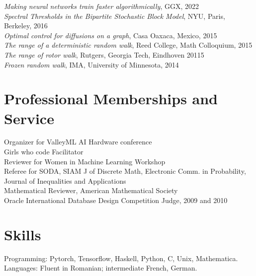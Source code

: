 \documentclass[margin,line]{res}
\begin{document}
\begin{resume}
\emph{Making neural networks train faster algorithmically}, GGX, 2022 \\
\emph{Spectral Thresholds in the Bipartite Stochastic Block Model}, NYU, Paris, Berkeley, 2016\\
\emph{Optimal control for diffusions on a graph}, Casa Oaxaca, Mexico, 2015\\
\emph{The range of a deterministic random walk}, Reed College, Math Colloquium, 2015\\
\emph{The range of rotor walk}, Rutgers, Georgia Tech, Eindhoven 20115\\
\emph{Frozen random walk}, IMA, University of Minnesota, 2014\\

\vspace*{-5.5mm}
\section{\sc Professional Memberships and Service}
Organizer for ValleyML AI Hardware conference \\
Girls who code Facilitator \\
Reviewer for Women in Machine Learning Workshop\\
Referee for SODA, SIAM J of Discrete Math, Electronic Comm. in Probability, Journal of Inequalities and Applications \\
Mathematical Reviewer, American Mathematical Society \\
Oracle International Database Design Competition Judge, 2009 and 2010\\
\vspace*{-5.5mm}

\section{\sc Skills} 
Programming:  Pytorch, Tensorflow, Haskell, Python, C, Unix, Mathematica. \\
Languages: Fluent in Romanian; intermediate French, German.
\vspace{-.2cm}


\end{resume}
\end{document}
